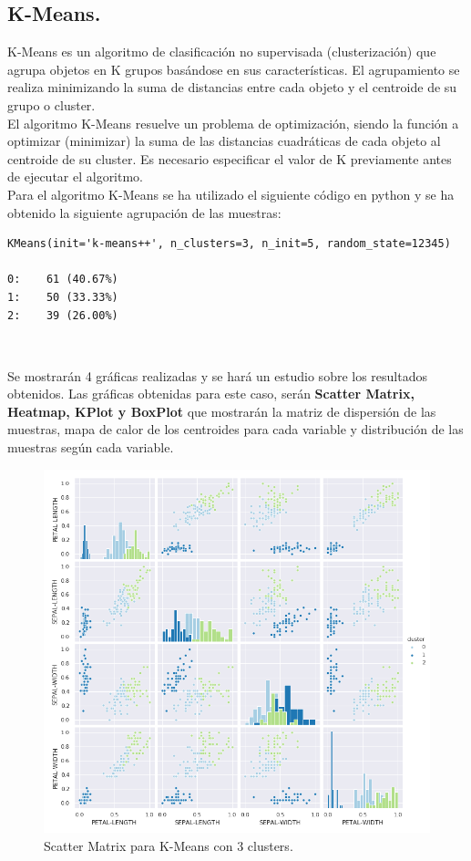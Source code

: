 \documentclass[a4paper, 20pt]{article}
\begin{document}
\subsection{K-Means.}

K-Means es un algoritmo de clasificación no supervisada (clusterización) que agrupa objetos en K grupos basándose en sus características. El agrupamiento se realiza minimizando la suma de distancias entre cada objeto y el centroide de su grupo o cluster.\\ 

El algoritmo K-Means resuelve un problema de optimización, siendo la función a optimizar (minimizar) la suma de las distancias cuadráticas de cada objeto al centroide de su cluster. Es necesario especificar el valor de K previamente antes de ejecutar el algoritmo.\\

Para el algoritmo K-Means se ha utilizado el siguiente código en python y se ha obtenido la siguiente agrupación de las muestras:\\

\begin{lstlisting}
KMeans(init='k-means++', n_clusters=3, n_init=5, random_state=12345)

0:    61 (40.67%)
1:    50 (33.33%)
2:    39 (26.00%)
\end{lstlisting}\

Se mostrarán 4 gráficas realizadas y se hará un estudio sobre los resultados obtenidos. Las gráficas obtenidas para este caso, serán \textbf{Scatter Matrix, Heatmap, KPlot y BoxPlot} que mostrarán la matriz de dispersión de las muestras, mapa de calor de los centroides para cada variable y distribución de las muestras según cada variable.

\clearpage

\begin{figure}[h]
\centering
\includegraphics[scale=0.62]{dani/scatmatrixK-MeansIRIS.png}
\caption{Scatter Matrix para K-Means con 3 clusters.}
\label{smkm}
\end{figure}\
\end{document}
